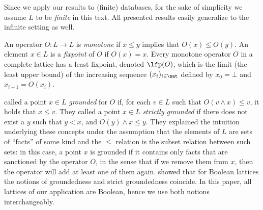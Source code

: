 Since we apply our results to (finite) databases, for the sake of simplicity we assume $L$ to be \emph{finite} in this text. All presented results easily generalize to the infinite setting as well. 



An operator $O:L\to L$ is \emph{monotone} if $x\leq y$ implies that $O(x)\leq O(y)$.
An element $x\in L$ is 
a \emph{fixpoint}
of $O$ if
$O(x)=x$.
Every monotone operator $O$ in a %
complete lattice has a least fixpoint, denoted $\lfp(O)$, which is 
the limit (the least upper bound) of the increasing sequence $(x_i)_{i \in \nat}$ defined by $x_0=\bot$ and $x_{i+1} = O(x_i)$. 


 called a point  $x\in L$ \emph{grounded} for $O$ if, for each $v\in L$ such that $O(v\land x)\leq v$, it holds that $x\leq v$. They called a point $x\in L$ \emph{strictly grounded} if there does not exist a $y$ such that $y<x$, and $O(y)\land x \leq y$. 
They explained the intuition underlying these concepts under the assumption that the elements of $L$ are sets of ``facts'' of some kind and the $\leq$ relation is the subset relation between such sets:
in this case, a point $x$ is grounded if it contains only facts that are sanctioned by the operator $O$, 
in the sense that if we remove them from $x$, then the operator will add at least one of them again. 
\citet{phd/Bogaerts15} showed that for Boolean lattices the notions of groundedness and strict groundedness coincide. In this paper, all lattices of our application are Boolean, hence we use both notions interchangeably.

